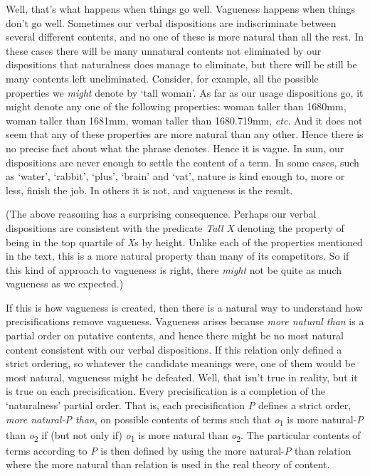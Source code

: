 \documentclass[
  11pt,
  letterpaper,
  DIV=11,
  numbers=noendperiod,
  oneside]{scrartcl}
\begin{document}
Well, that's what happens when things go well. Vagueness happens when
things don't go well. Sometimes our verbal dispositions are
indiscriminate between several different contents, and no one of these
is more natural than all the rest. In these cases there will be many
unnatural contents not eliminated by our dispositions that naturalness
does manage to eliminate, but there will be still be many contents left
uneliminated. Consider, for example, all the possible properties we
\emph{might} denote by `tall woman'. As far as our usage dispositions
go, it might denote any one of the following properties: woman taller
than 1680mm, woman taller than 1681mm, woman taller than 1680.719mm,
\emph{etc}. And it does not seem that any of these properties are more
natural than any other. Hence there is no precise fact about what the
phrase denotes. Hence it is vague. In sum, our dispositions are never
enough to settle the content of a term. In some cases, such as `water',
`rabbit', `plus', `brain' and `vat', nature is kind enough to, more or
less, finish the job. In others it is not, and vagueness is the result.

(The above reasoning has a surprising consequence. Perhaps our verbal
dispositions are consistent with the predicate \emph{Tall X} denoting
the property of being in the top quartile of \emph{X}s by height. Unlike
each of the properties mentioned in the text, this is a more natural
property than many of its competitors. So if this kind of approach to
vagueness is right, there \emph{might} not be quite as much vagueness as
we expected.)

If this is how vagueness is created, then there is a natural way to
understand how precisifications remove vagueness. Vagueness arises
because \emph{more natural than} is a partial order on putative
contents, and hence there might be no most natural content consistent
with our verbal dispositions. If this relation only defined a strict
ordering, so whatever the candidate meanings were, one of them would be
most natural, vagueness might be defeated. Well, that isn't true in
reality, but it is true on each precisification. Every precisification
is a completion of the `naturalness' partial order. That is, each
precisification \emph{P} defines a strict order, \emph{more natural-P
than}, on possible contents of terms such that \emph{o}\textsubscript{1}
is more natural-\emph{P} than \emph{o}\textsubscript{2} if (but not only
if) \emph{o}\textsubscript{1} is more natural than
\emph{o}\textsubscript{2}. The particular contents of terms according to
\emph{P} is then defined by using the more natural-\emph{P} than
relation where the more natural than relation is used in the real theory
of content.
\end{document}
